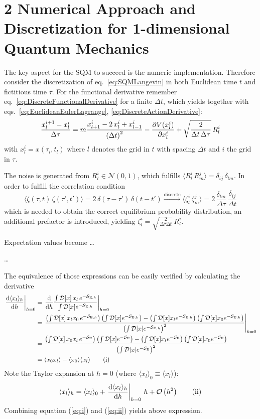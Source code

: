 \documentclass[11pt,a4paper]{scrartcl}
\newcommand{\avg}[1]{\langle#1\rangle}
\newcommand{\SE}{\ensuremath{\mathcal{S}_{\mathrm{E}}}}
\newcommand{\SEh}{\mathcal{S}_{\mathrm{E},h}}
\newcommand{\pathinth}[1]{\int\mathcal{D}[x]#1e^{-\SEh}}
\newcommand{\pathint}[1]{\int\mathcal{D}[x]#1e^{-\SE}}
\newcommand{\BigO}[1]{\mathcal{O}\left(#1\right)}
\begin{document}
\section*{2 Numerical Approach and Discretization for 1-dimensional Quantum
Mechanics}
The key aspect for the SQM to succeed is the numeric implementation. Therefore
consider the discretization of eq.~\eqref{eq:SQMLangevin} in both Euclidean
time $t$ and fictitious time $\tau$. For the functional derivative remember
eq.~\eqref{eq:DiscreteFunctionalDerivative} for a finite $\Delta{t}$, which
yields together with eqs.~\eqref{eq:EuclideanEulerLagrange},
\eqref{eq:DiscreteActionDerivative}:
\begin{equation}
    \frac{x_l^{i+1}-x_l^i}{\Delta\tau}=m\frac{x_{l+1}^i-2\,x_l^i+x_{l-1}^i}{\left(\Delta{t}\right)^2}-\pdv{V(x_l^i)}{x_l^i}+\sqrt{\frac{2}{\Delta{t}\,\Delta\tau}}\,R_l^i
    \label{eq:DiscreteLangevin}
\end{equation}
with $x_l^i=x(\tau_i,t_l)$ where $l$ denotes the grid in $t$ with spacing
$\Delta{t}$ and $i$ the grid in $\tau$.

The noise is generated from $R^i_l\in\mathcal{N}(0,1)$, which fulfills
$\langle{R^i_l}\,{R^j_m}\rangle=\delta_{ij}\,\delta_{lm}$. In order to fulfill
the correlation condition
\begin{equation*}
    \langle\zeta(\tau,t)\,\zeta(\tau',t')\rangle=2\,\delta(\tau-\tau')\,\delta(t-t')
    \xrightarrow{\mathrm{discrete}}
    \langle\zeta^i_l\,\zeta^j_m\rangle=2\,\frac{\delta_{lm}}{\Delta\tau}\,\frac{\delta_{ij}}{\Delta{t}}
\end{equation*}
which is needed to obtain the correct equilibrium probability distribution, an
additional prefactor is introduced, yielding
$\zeta^i_l=\sqrt{\frac{2}{\Delta{\tau}\Delta{t}}}\,R^i_l$.

Expectation values become \ldots

\dots

The equivalence of those expressions can be easily verified by calculating the
derivative
\begin{align*}
    \eval{\dv{\avg{x_l}_h}{h}}_{h=0} &=
    \eval{\dv{h}\frac{\pathinth{\,x_l\,}}{\pathinth{}}}_{h=0} \\ &=
    \eval{\frac{\left(\pathinth{\,x_l x_0\,}\right)\left(\pathinth{}\right)
    -\left(\pathinth{x_l}\right)\left(\pathinth{x_0}\right)}
    {\left(\pathinth{}\right)^2}}_{h=0} \\ &=
    \frac{\left(\pathint{\,x_0 x_l\,}\right)\left(\pathint{}\right)
    -\left(\pathint{x_l}\right)\left(\pathint{x_0}\right)}
    {\left(\pathint{}\right)^2} \\ &=
    \avg{x_0 x_l}-\avg{x_0}\avg{x_l} \tag{i}\label{eq:i}
\end{align*}
Note the Taylor expansion at $h=0$ (where $\avg{x_l}_0\equiv\avg{x_l}$):
\begin{equation*}
    \avg{x_l}_h=\avg{x_l}_0+\eval{\dv{\avg{x_l}_h}{h}}_{h=0}\,h+\BigO{h^2}
    \tag{ii}\label{eq:ii}
\end{equation*}
Combining equation (\ref{eq:i}) and (\ref{eq:ii}) yields above expression.
\end{document}
